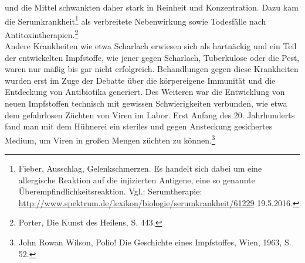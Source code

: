 \documentclass[
    a4paper,
    12pt,
    hyphens,
    chapterprefix=true,
    headheight=33pt,
    footheight=29pt,
    headings=optiontohead,
]{scrartcl}
\begin{document}
und die Mittel schwankten daher stark in Reinheit und Konzentration. Dazu kam die Serumkrankheit\footnote{Fieber, Ausschlag,
Gelenkschmerzen. Es handelt sich dabei um eine allergische Reaktion auf die injizierten Antigene, eine so genannte
Überempfindlichkeitsreaktion. Vgl.: Serumtherapie: \url{http://www.spektrum.de/lexikon/biologie/serumkrankheit/61229} 19.5.2016.}
als verbreitete Nebenwirkung sowie Todesfälle nach Antitoxintherapien.\footnote{Porter, Die Kunst des Heilens, S. 443.}\\
Andere Krankheiten wie etwa Scharlach erwiesen sich als hartnäckig und ein Teil der entwickelten Impfstoffe, wie jener gegen Scharlach, Tuberkulose oder die Pest, waren nur mäßig bis gar nicht erfolgreich. Behandlungen gegen diese Krankheiten wurden erst im Zuge der Debatte über die körpereigene Immunität und die Entdeckung von Antibiotika generiert. Des Weiteren war die Entwicklung von neuen Impfstoffen technisch mit gewissen Schwierigkeiten verbunden, wie etwa dem gefahrlosen Züchten von Viren im Labor. Erst Anfang des 20. Jahrhunderts fand man mit dem Hühnerei ein steriles und gegen Ansteckung gesichertes Medium, um Viren in großen Mengen züchten zu können.\footnote{John Rowan Wilson, Polio! Die Geschichte eines Impfstoffes, Wien, 1963, S. 52.}

\newpage
\end{document}
